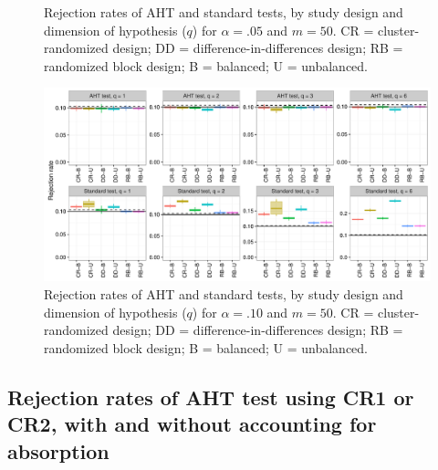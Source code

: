 \documentclass{article}\usepackage[]{graphicx}\usepackage[]{color}
\newenvironment{knitrout}{}{} %
\begin{document}
\begin{landscape}
\begin{knitrout}
\begin{figure}[H]
{}

\caption[Rejection rates of AHT and standard tests, by study design and dimension of hypothesis (]{Rejection rates of AHT and standard tests, by study design and dimension of hypothesis ($q$) for $\alpha = .05$ and $m = 50$. CR = cluster-randomized design; DD = difference-in-differences design; RB = randomized block design; B = balanced; U = unbalanced.}\label{fig:balance_05_50}
\end{figure}


\end{knitrout}

\begin{knitrout}
\color{fgcolor}\begin{figure}[H]

{\centering \includegraphics[width=\linewidth]{CR_fig/balance_10_50-1} 

}

\caption[Rejection rates of AHT and standard tests, by study design and dimension of hypothesis (]{Rejection rates of AHT and standard tests, by study design and dimension of hypothesis ($q$) for $\alpha = .10$ and $m = 50$. CR = cluster-randomized design; DD = difference-in-differences design; RB = randomized block design; B = balanced; U = unbalanced.}\label{fig:balance_10_50}
\end{figure}


\end{knitrout}

\newpage
\subsection{Rejection rates of AHT test using CR1 or CR2, with and without accounting for absorption}

\begin{knitrout}
\color{fgcolor}\begin{figure}[H]


\end{figure}
\end{knitrout}
\end{landscape}
\end{document}
